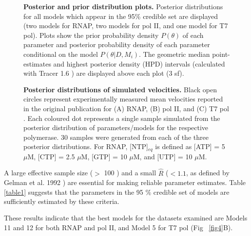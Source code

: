 \documentclass[10pt,letterpaper]{article}
\begin{document}
\begin{figure}[!ht]
\caption{\textbf{Posterior and prior distribution plots.} Posterior distributions for all models which appear in the 95\% credible set are displayed (two models for RNAP, two models for pol II, and one model for T7 pol). Plots show the prior probability density $P(\theta)$ of each parameter and posterior probability density of each parameter conditional on the model $P(\theta | D, M_i)$. The geometric median point-estimates and  highest posterior density (HPD) intervals (calculated with Tracer 1.6 \cite{rambaut2013tracer}) are displayed above each plot (3 sf). }
\label{fig5}
\end{figure}





\begin{figure}[!h]
\caption{ \textbf{Posterior distributions of simulated velocities.} Black open circles represent experimentally measured mean velocities reported in the original publication for (A) RNAP,  (B) pol II, and (C) T7 pol \cite{abbondanzieri2005direct,schweikhard2014transcription,thomen2008t7}. Each coloured dot represents a single sample simulated from the posterior distribution of parameters/models for the respective polymerase. 30 samples were generated from each of the three posterior distributions. For RNAP, [NTP]$_{eq}$ is defined as [ATP] = 5 $\mu$M, [CTP] = 2.5 $\mu$M, [GTP] = 10 $\mu$M, and [UTP] = 10 $\mu$M. }
\label{fig6}
\end{figure}









A large effective sample size ($>$ 100 \cite{rambaut2013tracer}) and a small $\hat{R}$ ($< 1.1$, as defined by Gelman et al. 1992  \cite{gelman1992inference, brooks2011handbook, brooks1998general}) are essential for making reliable parameter estimates. Table \ref{table1} suggests that the parameters in the 95 \% credible set of models are sufficiently estimated by these criteria.





These results indicate that the best models for the datasets examined are Models 11 and 12 for both RNAP and pol II, and Model 5 for T7 pol (Fig ~\ref{fig4}B).
\end{document}
